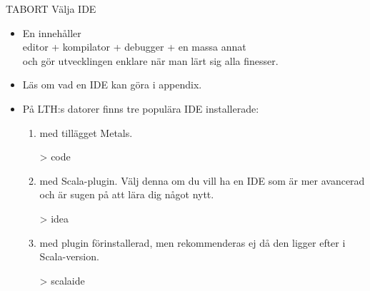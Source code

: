 

\begin{Slide}{\TODO TABORT Välja IDE}\SlideFontSmall
\begin{itemize}
\item En   innehåller \\ editor + kompilator + debugger + en massa annat\\och gör utvecklingen enklare när man lärt sig alla finesser.

\item Läs om vad en IDE kan göra i appendix.

\pause

\item På LTH:s datorer finns tre populära IDE installerade:
\begin{enumerate}\SlideFontSmall

\item {} med tillägget Metals. 
\begin{REPL}[numbers=none]
> code
\end{REPL}


\item {} med Scala-plugin. Välj denna om du vill ha en IDE som är mer avancerad och är sugen på att lära dig något nytt.
\begin{REPL}[numbers=none]
> idea
\end{REPL}

\item {} med plugin  förinstallerad, men rekommenderas ej då den ligger efter i Scala-version.
\begin{REPL}[numbers=none]
> scalaide
\end{REPL}

\end{enumerate}
\end{itemize}
\end{Slide}

